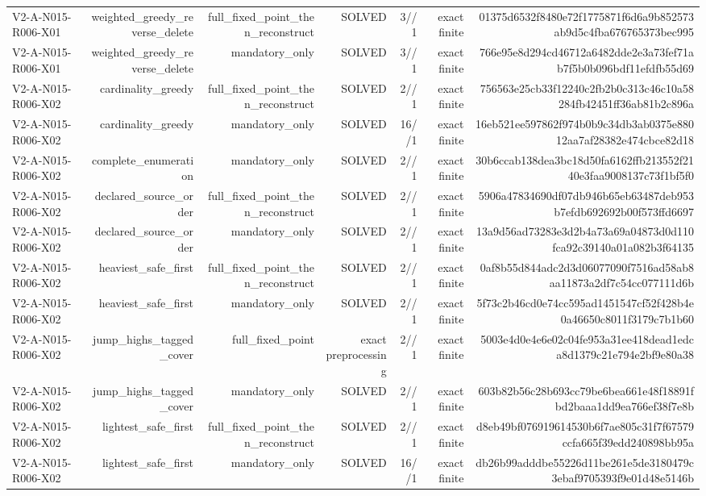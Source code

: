{\begin{longtable}{lrrrrrr}
V2-A-N015-R006-X01 & weighted\_greedy\_reverse\_delete & full\_fixed\_point\_then\_reconstruct & SOLVED & 3//1 & exact finite & 01375d6532f8480e72f1775871f6d6a9b852573ab9d5c4fba676765373bec995 \\
V2-A-N015-R006-X01 & weighted\_greedy\_reverse\_delete & mandatory\_only & SOLVED & 3//1 & exact finite & 766e95e8d294cd46712a6482dde2e3a73fef71ab7f5b0b096bdf11efdfb55d69 \\
V2-A-N015-R006-X02 & cardinality\_greedy & full\_fixed\_point\_then\_reconstruct & SOLVED & 2//1 & exact finite & 756563e25cb33f12240c2fb2b0c313c46c10a58284fb42451ff36ab81b2c896a \\
V2-A-N015-R006-X02 & cardinality\_greedy & mandatory\_only & SOLVED & 16//1 & exact finite & 16eb521ee597862f974b0b9c34db3ab0375e88012aa7af28382e474cbce82d18 \\
V2-A-N015-R006-X02 & complete\_enumeration & mandatory\_only & SOLVED & 2//1 & exact finite & 30b6ccab138dea3bc18d50fa6162ffb213552f2140e3faa9008137c73f1bf5f0 \\
V2-A-N015-R006-X02 & declared\_source\_order & full\_fixed\_point\_then\_reconstruct & SOLVED & 2//1 & exact finite & 5906a47834690df07db946b65eb63487deb953b7efdb692692b00f573ffd6697 \\
V2-A-N015-R006-X02 & declared\_source\_order & mandatory\_only & SOLVED & 2//1 & exact finite & 13a9d56ad73283e3d2b4a73a69a04873d0d110fca92c39140a01a082b3f64135 \\
V2-A-N015-R006-X02 & heaviest\_safe\_first & full\_fixed\_point\_then\_reconstruct & SOLVED & 2//1 & exact finite & 0af8b55d844adc2d3d06077090f7516ad58ab8aa11873a2df7c54cc077111d6b \\
V2-A-N015-R006-X02 & heaviest\_safe\_first & mandatory\_only & SOLVED & 2//1 & exact finite & 5f73c2b46cd0e74cc595ad1451547cf52f428b4e0a46650c8011f3179c7b1b60 \\
V2-A-N015-R006-X02 & jump\_highs\_tagged\_cover & full\_fixed\_point & exact preprocessing & 2//1 & exact finite & 5003e4d0e4e6e02c04fe953a31ee418dead1edca8d1379c21e794e2bf9e80a38 \\
V2-A-N015-R006-X02 & jump\_highs\_tagged\_cover & mandatory\_only & SOLVED & 2//1 & exact finite & 603b82b56c28b693cc79be6bea661e48f18891fbd2baaa1dd9ea766ef38f7e8b \\
V2-A-N015-R006-X02 & lightest\_safe\_first & full\_fixed\_point\_then\_reconstruct & SOLVED & 2//1 & exact finite & d8eb49bf076919614530b6f7ae805c31f7f67579ccfa665f39edd240898bb95a \\
V2-A-N015-R006-X02 & lightest\_safe\_first & mandatory\_only & SOLVED & 16//1 & exact finite & db26b99adddbe55226d11be261e5de3180479c3ebaf9705393f9e01d48e5146b \\

\end{longtable}}

